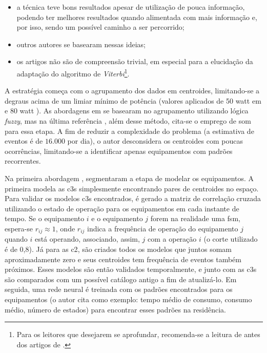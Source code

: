 \begin{enumerate}[label=\textbf{1.\arabic*},wide=\parindent]
\begin{enumerate}[label*=.\textbf{\arabic*},wide=\parindent]
\begin{itemize}[wide=\parindent]
\begin{itemize}
\item a técnica teve bons resultados apesar de utilização de pouca
informação, podendo ter melhores resultados quando alimentada com mais
informação e, por isso, sendo um possível caminho a ser percorrido;
\item outros autores \cite{nilm_bergman_distribuido_2011,
nilm_zeifman_vast_2011,nilm_zeifman_vast_hisample_pdfmerge_2011,
nilm_zeifman_vastext_approach_2012,
nilm_zeifman_statistical_vastext_1stws_2012,
nilm_zeifman_statistical_naive_enduses_2013} se basearam nessas
ideias;
\item os artigos não são de compreensão trivial, em especial para a
elucidação da adaptação do algoritmo de \emph{Viterbi}\footnote{Para os
leitores que desejarem se aprofundar, recomenda-se a leitura de
\cite{nilm_bergman_distribuido_2011} antes dos artigos de
\citeauthor*{nilm_baranski_genetic_detalhado_2004_20}.}.
\end{itemize}


A estratégia começa com o agrupamento dos dados em centroides,
limitando-se a degraus acima de um limiar mínimo de potência (valores
aplicados de 50 \acs{watt} em
\cite{nilm_baranski_genetic_base_2003_19} e 80 \acs{watt}
\cite{nilm_baranski_genetic_detalhado_2004_20}). As abordagens em
\cite{nilm_baranski_genetic_base_2003_19,
nilm_baranski_genetic_detalhado_2004_20} se basearam no agrupamento
utilizando lógica \emph{fuzzy}, mas na última referência
\cite{nilm_baranski_summary_2004_21}, além desse método, cita-se o
emprego de \gls{som} para essa etapa. A fim de reduzir a complexidade
do problema (a estimativa de eventos é de $16.000$ por dia), o autor
desconsidera os centroides com poucas ocorrências, limitando-se a
identificar apenas equipamentos com padrões recorrentes.

Na primeira abordagem \cite{nilm_baranski_genetic_base_2003_19},
\citeauthor*{nilm_baranski_genetic_base_2003_19} segmentaram a etapa
de modelar os equipamentos. A primeira modela as \glspl{c3} simplesmente
encontrando pares de centroides no espaço. Para validar os modelos
\glspl{c3} encontrados, é gerado a matriz de correlação cruzada
utilizando o estado de operação para os equipamentos em cada instante de
tempo. Se o equipamento $i$ e o equipamento $j$ forem na realidade uma
\gls{fsm}, espera-se $r_{ij}\approx1$, onde $r_{ij}$ indica a
frequência de operação do equipamento $j$ quando $i$ está operando,
associando, assim, $j$ com a operação $i$ (o corte utilizado é de
0,8). Já para as \gls{c2}, são criados todos os modelos que
juntos somam aproximadamente zero e seus centroides tem frequência de
eventos também próximos. Esses modelos são então validados
temporalmente, e junto com as \glspl{c3} são comparados com um
possível catálogo antigo a fim de atualizá-lo. Em seguida, uma rede
neural é treinada com os padrões encontrados para os equipamentos (o
autor cita como exemplo: tempo médio de consumo, consumo médio, número
de estados) para encontrar esses padrões na residência.


\end{itemize}
\end{enumerate}
\end{enumerate}
